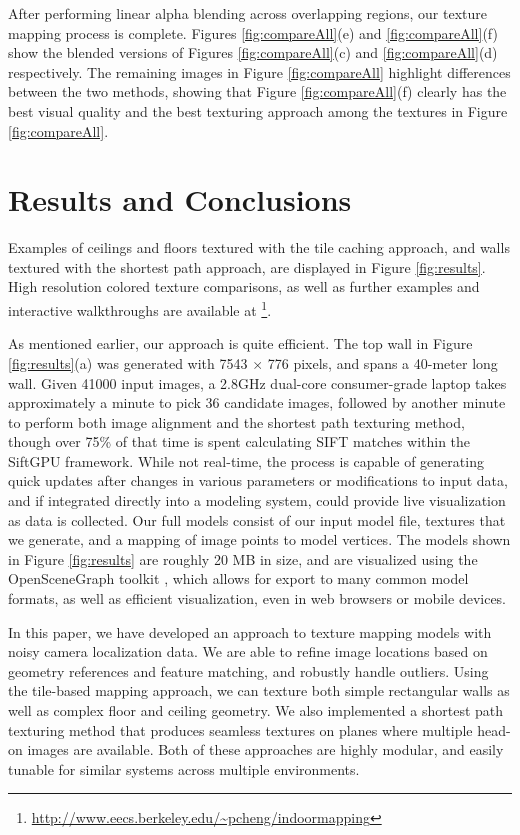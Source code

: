 \documentclass[]{spie}  %
\begin{document}
After performing linear alpha blending across overlapping regions, our
texture mapping process is complete. Figures \ref{fig:compareAll}(e)
and \ref{fig:compareAll}(f) show the blended versions of Figures
\ref{fig:compareAll}(c) and \ref{fig:compareAll}(d) respectively. The
remaining images in Figure \ref{fig:compareAll} highlight differences
between the two methods, showing that Figure \ref{fig:compareAll}(f)
clearly has the best visual quality and the best texturing approach
among the textures in Figure \ref{fig:compareAll}.

\section{Results and Conclusions}
\label{sec:resultsAndConclusions}
Examples of ceilings and floors textured with the tile caching
approach, and walls textured with the shortest path approach, are
displayed in Figure \ref{fig:results}. High resolution colored texture
comparisons, as well as further examples and interactive walkthroughs
are available at
\footnote{\url{http://www.eecs.berkeley.edu/~pcheng/indoormapping}}.

As mentioned earlier, our approach is quite efficient. The top wall in
Figure \ref{fig:results}(a) was generated with 7543 $\times$ 776
pixels, and spans a 40-meter long wall. Given 41000 input images, a
2.8GHz dual-core consumer-grade laptop takes approximately a minute to
pick 36 candidate images, followed by another minute to perform both
image alignment and the shortest path texturing method, though over
75\% of that time is spent calculating SIFT matches within the SiftGPU
framework. While not real-time, the process is capable of generating
quick updates after changes in various parameters or modifications to
input data, and if integrated directly into a modeling system, could
provide live visualization as data is collected. Our full models
consist of our input model file, textures that we generate, and a
mapping of image points to model vertices. The models shown in Figure
\ref{fig:results} are roughly 20 MB in size, and are visualized using
the OpenSceneGraph toolkit \cite{openscenegraph}, which allows for
export to many common model formats, as well as efficient
visualization, even in web browsers or mobile devices.

In this paper, we have developed an approach to texture mapping models
with noisy camera localization data. We are able to refine image
locations based on geometry references and feature matching, and
robustly handle outliers. Using the tile-based mapping approach, we
can texture both simple rectangular walls as well as complex floor and
ceiling geometry. We also implemented a shortest path texturing method
that produces seamless textures on planes where multiple head-on
images are available. Both of these approaches are highly modular, and
easily tunable for similar systems across multiple environments.
\end{document}
